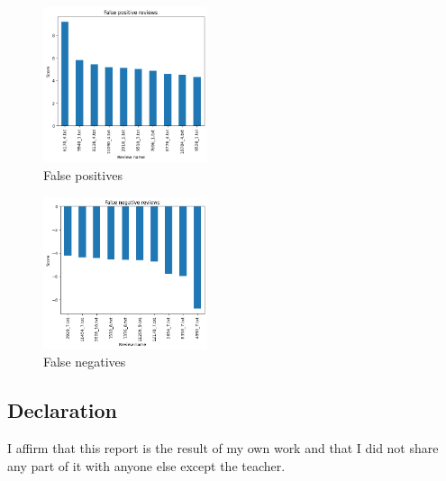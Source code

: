 \documentclass{article}
\begin{document}
\begin{multicols}{2}
        \begin{figure}[H]
            \centering
            \includegraphics[width=0.43\textwidth]{false_positives_lr.png}
            \caption{\small False positives}
            \label{fig:falseposlr}
        \end{figure}
    
        \begin{figure}[H]
            \centering
            \includegraphics[width=0.43\textwidth]{false negatives_lr.png}
            \caption{\small False negatives}
            \label{fig:falseneglr}
        \end{figure}
    

\nopagebreak
\end{multicols}

\vfill
\subsection*{\normalsize Declaration}
I aﬃrm that this report is the result of my own work and that I did not share any part of it with anyone else except the teacher.
\end{document}
